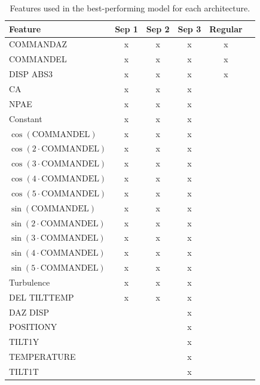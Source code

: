 \begin{table}[!htbp]
    \centering
    \caption[Selected features for each neural network pointing model architecture]{Features used in the best-performing model for each architecture.}
    \begin{tabular}{|l|ccccc|}
        \hline
        Feature & Sep 1 & Sep 2 & Sep 3 & Regular & \\ \hline
        COMMANDAZ & x & x & x & x & \\ \hline
        COMMANDEL & x & x & x & x & \\ \hline
        DISP ABS3 & x & x & x & x & \\ \hline
        CA & x & x & x & & \\ \hline
        NPAE & x & x & x & & \\ \hline
        Constant & x & x & x & & \\ \hline
        $\cos{(\text{COMMANDEL})}$ & x & x & x & & \\ \hline
        $\cos{(2\cdot \text{COMMANDEL})}$ & x & x & x & & \\ \hline
        $\cos{(3\cdot \text{COMMANDEL})}$ & x & x & x & & \\ \hline
        $\cos{(4\cdot \text{COMMANDEL})}$ & x & x & x & & \\ \hline
        $\cos{(5\cdot \text{COMMANDEL})}$ & x & x & x & & \\ \hline
        $\sin{(\text{COMMANDEL})}$ & x & x & x & & \\ \hline
        $\sin{(2 \cdot \text{COMMANDEL})}$ & x & x & x & & \\ \hline
        $\sin{(3 \cdot \text{COMMANDEL})}$ & x & x & x & & \\ \hline
        $\sin{(4 \cdot \text{COMMANDEL})}$ & x & x & x & & \\ \hline
        $\sin{(5 \cdot \text{COMMANDEL})}$ & x & x & x & & \\ \hline
        Turbulence & x & x & x & & \\ \hline
        DEL TILTTEMP & x & x & x & & \\ \hline
        DAZ DISP & & & x & & \\ \hline
        POSITIONY & & & x & & \\ \hline
        TILT1Y & & & x & & \\ \hline
        TEMPERATURE & & & x & & \\ \hline
        TILT1T & & & x & & \\ \hline
    \end{tabular}
    \label{tab:exp1_features}
\end{table}


